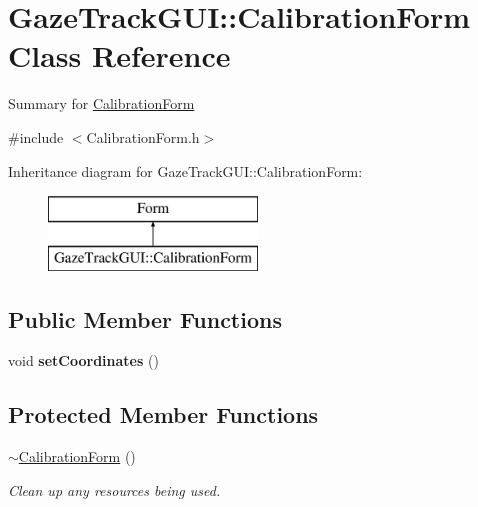 \hypertarget{class_gaze_track_g_u_i_1_1_calibration_form}{}\section{Gaze\+Track\+G\+UI\+:\+:Calibration\+Form Class Reference}
\label{class_gaze_track_g_u_i_1_1_calibration_form}


Summary for \mbox{\hyperlink{class_gaze_track_g_u_i_1_1_calibration_form}{Calibration\+Form}}  




{\ttfamily \#include $<$Calibration\+Form.\+h$>$}

Inheritance diagram for Gaze\+Track\+G\+UI\+:\+:Calibration\+Form\+:\begin{figure}[H]
\begin{center}
\leavevmode
\includegraphics[height=2.000000cm]{class_gaze_track_g_u_i_1_1_calibration_form}
\end{center}
\end{figure}
\subsection*{Public Member Functions}
\begin{DoxyCompactItemize}
\item 
\mbox{\label{class_gaze_track_g_u_i_1_1_calibration_form_ac09a90521622ec56819a249422a0e1d1}} 
void {\bfseries set\+Coordinates} ()
\end{DoxyCompactItemize}
\subsection*{Protected Member Functions}
\begin{DoxyCompactItemize}
\item 
\mbox{\hyperlink{class_gaze_track_g_u_i_1_1_calibration_form_a761b521b0ba7b8effae472f061f7fa2f}{$\sim$\+Calibration\+Form}} ()
\begin{DoxyCompactList}\small\item\em Clean up any resources being used. \end{DoxyCompactList}\end{DoxyCompactItemize}
